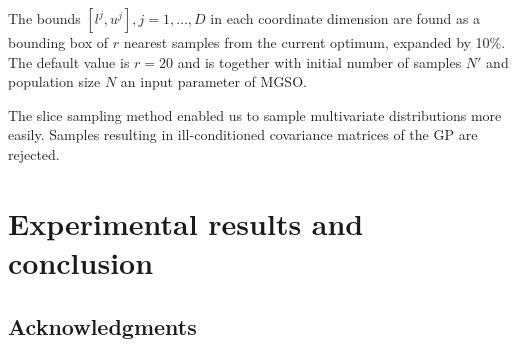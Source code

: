 \documentclass{itatnew}
\begin{document}
The bounds $[l^j, u^j], j=1,\ldots,D$ in each coordinate dimension are found as a bounding box of $r$ nearest samples from the current optimum, expanded by 10\%. The default value is $r=20$ and is together with initial number of samples $N'$ and population size $N$ an input parameter of MGSO.

The slice sampling method enabled us to sample multivariate distributions more easily. Samples resulting in ill-con\-di\-tion\-ed covariance matrices of the GP are rejected.



\section{Experimental results and conclusion}
\label{sec:results}



% 
% 
% 





\subsection*{Acknowledgments}
\end{document}
